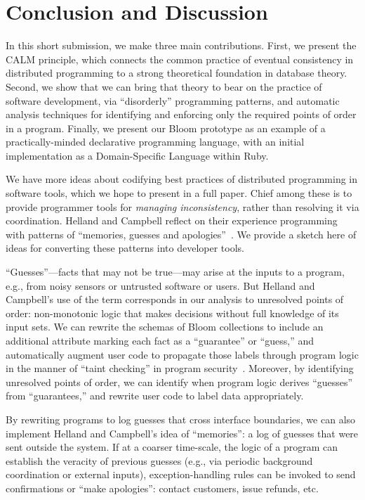 \section{Conclusion and Discussion}
\label{sec:conclusion}
In this short submission, we make three main contributions.  First, we present
the CALM principle, which connects the common practice of eventual consistency
in distributed programming to a strong theoretical foundation in database
theory.  Second, we show that we can bring that theory to bear on the practice
of software development, via ``disorderly'' programming patterns, and automatic
analysis techniques for identifying and enforcing only the required points of
order in a program. Finally, we present our Bloom prototype as an example of a
practically-minded declarative programming language, with an initial
implementation as a Domain-Specific Language within Ruby.

We have more ideas about codifying best practices of distributed programming in software tools, which we hope to present in a full paper.  Chief among these is to provide programmer tools for \emph{managing inconsistency}, rather than resolving it via coordination.  Helland and Campbell reflect on their experience programming with patterns of ``memories, guesses and apologies''~\cite{quicksand}.  We provide a sketch here of ideas for converting these patterns into developer tools.

``Guesses''---facts that may not be true---may arise at the inputs to a program, e.g., from noisy sensors or untrusted software or users.  But Helland and Campbell's use of the term corresponds in our analysis to unresolved points of order: non-monotonic logic that makes decisions without full knowledge of its input sets.  We can rewrite the schemas of Bloom collections to include an additional attribute marking each fact as a ``guarantee'' or ``guess,'' and automatically augment user code to propagate those labels through program logic in the manner of ``taint checking'' in program security~\cite{taint,asbestos}.  Moreover, by identifying unresolved points of order, we can identify when program logic derives ``guesses'' from ``guarantees,'' and rewrite user code to label data appropriately.

By rewriting programs to log guesses that cross interface boundaries, we can also implement Helland and Campbell's idea of ``memories'': a log of guesses that were sent outside the system.  If at a coarser time-scale, the logic of a program can establish the veracity of previous guesses (e.g., via periodic background coordination or external inputs), exception-handling rules can be invoked to send confirmations or ``make apologies'': contact customers, issue refunds, etc.

